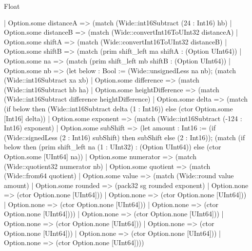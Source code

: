 \begin{lexlean}{Float}
\begin{semanticmodule}
{                        | Option.some distanceA => (match (Wide::int16Subtract (24 : Int16) hb)
                          | Option.some distanceB => (match (Wide::convertInt16ToUInt32 distanceA)
                            | Option.some shiftA => (match (Wide::convertInt16ToUInt32 distanceB)
                              | Option.some shiftB => (match (prim shift_left ma shiftA : (Option UInt64))
                                | Option.some na => (match (prim shift_left mb shiftB : (Option UInt64))
                                  | Option.some nb => (let below : Bool := (Wide::unsignedLess na nb); (match (Wide::int16Subtract xa xb)
                                    | Option.some difference => (match (Wide::int16Subtract hb ha)
                                      | Option.some heightDifference => (match (Wide::int16Subtract difference heightDifference)
                                        | Option.some delta => (match (if below then (Wide::int16Subtract delta (1 : Int16)) else (ctor Option.some [Int16] delta))
                                          | Option.some exponent => (match (Wide::int16Subtract (-124 : Int16) exponent)
                                            | Option.some subShift => (let amount : Int16 := (if (Wide::signedLess (2 : Int16) subShift) then subShift else (2 : Int16)); (match (if below then (prim shift_left na (1 : UInt32) : (Option UInt64)) else (ctor Option.some [UInt64] na))
                                              | Option.some numerator => (match (Wide::quotient32 numerator nb)
                                                | Option.some quotient => (match (Wide::from64 quotient)
                                                  | Option.some value => (match (Wide::round value amount)
                                                    | Option.some rounded => (pack32 sg rounded exponent)
                                                    | Option.none => (ctor Option.none [UInt64]))
                                                  | Option.none => (ctor Option.none [UInt64]))
                                                | Option.none => (ctor Option.none [UInt64]))
                                              | Option.none => (ctor Option.none [UInt64])))
                                            | Option.none => (ctor Option.none [UInt64]))
                                          | Option.none => (ctor Option.none [UInt64]))
                                        | Option.none => (ctor Option.none [UInt64]))
                                      | Option.none => (ctor Option.none [UInt64]))
                                    | Option.none => (ctor Option.none [UInt64])))
}
\end{semanticmodule}
\end{lexlean}

